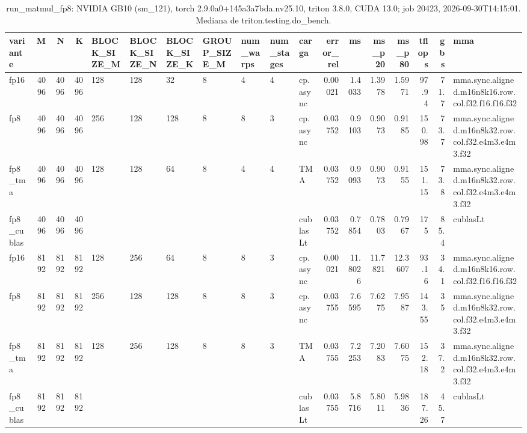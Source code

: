 \begin{table}[htbp]
  \centering\small
  \begin{tabular}{lrrrlllllllrrrrrrl}
    \toprule
    variante & M & N & K & BLOCK\_SIZE\_M & BLOCK\_SIZE\_N & BLOCK\_SIZE\_K & GROUP\_SIZE\_M & num\_warps & num\_stages & carga & error\_rel & ms & ms\_p20 & ms\_p80 & tflops & gbs & mma \\
    \midrule
    fp16 & 4096 & 4096 & 4096 & 128 & 128 & 32 & 8 & 4 & 4 & cp.async & 0.00021 & 1.4033 & 1.3978 & 1.5971 & 97.94 & 71.7 & mma.sync.aligned.m16n8k16.row.col.f32.f16.f16.f32 \\
    fp8 & 4096 & 4096 & 4096 & 256 & 128 & 128 & 8 & 8 & 3 & cp.async & 0.03752 & 0.9103 & 0.9073 & 0.9185 & 150.98 & 73.7 & mma.sync.aligned.m16n8k32.row.col.f32.e4m3.e4m3.f32 \\
    fp8\_tma & 4096 & 4096 & 4096 & 128 & 128 & 64 & 8 & 4 & 4 & TMA & 0.03752 & 0.9093 & 0.9073 & 0.9155 & 151.15 & 73.8 & mma.sync.aligned.m16n8k32.row.col.f32.e4m3.e4m3.f32 \\
    fp8\_cublas & 4096 & 4096 & 4096 &  &  &  &  &  &  & cublasLt & 0.03752 & 0.7854 & 0.7803 & 0.7967 & 175 & 85.4 & cublasLt \\
    fp16 & 8192 & 8192 & 8192 & 128 & 256 & 64 & 8 & 8 & 3 & cp.async & 0.00021 & 11.8026 & 11.7821 & 12.3607 & 93.16 & 34.1 & mma.sync.aligned.m16n8k16.row.col.f32.f16.f16.f32 \\
    fp8 & 8192 & 8192 & 8192 & 256 & 128 & 128 & 8 & 8 & 3 & cp.async & 0.03755 & 7.6595 & 7.6275 & 7.9587 & 143.55 & 35 & mma.sync.aligned.m16n8k32.row.col.f32.e4m3.e4m3.f32 \\
    fp8\_tma & 8192 & 8192 & 8192 & 128 & 256 & 128 & 8 & 8 & 3 & TMA & 0.03755 & 7.2253 & 7.2083 & 7.6075 & 152.18 & 37.2 & mma.sync.aligned.m16n8k32.row.col.f32.e4m3.e4m3.f32 \\
    fp8\_cublas & 8192 & 8192 & 8192 &  &  &  &  &  &  & cublasLt & 0.03755 & 5.8716 & 5.8011 & 5.9836 & 187.26 & 45.7 & cublasLt \\
    \bottomrule
  \end{tabular}
  \caption{run\_matmul\_fp8: NVIDIA GB10 (sm\_121), torch 2.9.0a0+145a3a7bda.nv25.10, triton 3.8.0, CUDA 13.0; job 20423, 2026-09-30T14:15:01. Mediana de triton.testing.do\_bench.}
  \label{tab:hennessy-580-run-matmul-fp8}
\end{table}

